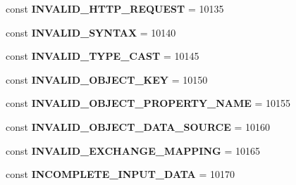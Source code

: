 \begin{DoxyCompactItemize}
\item 
\hypertarget{class_able_polecat___error_a11477fb5d1e040bd7d9d202cb12767a5}{}const {\bfseries I\+N\+V\+A\+L\+I\+D\+\_\+\+H\+T\+T\+P\+\_\+\+R\+E\+Q\+U\+E\+S\+T} = 10135\label{class_able_polecat___error_a11477fb5d1e040bd7d9d202cb12767a5}

\item 
\hypertarget{class_able_polecat___error_ab6687dae11b9c0fd3edf077baaa974c2}{}const {\bfseries I\+N\+V\+A\+L\+I\+D\+\_\+\+S\+Y\+N\+T\+A\+X} = 10140\label{class_able_polecat___error_ab6687dae11b9c0fd3edf077baaa974c2}

\item 
\hypertarget{class_able_polecat___error_a1ea3de8b3a498c613b19031b8d4fb269}{}const {\bfseries I\+N\+V\+A\+L\+I\+D\+\_\+\+T\+Y\+P\+E\+\_\+\+C\+A\+S\+T} = 10145\label{class_able_polecat___error_a1ea3de8b3a498c613b19031b8d4fb269}

\item 
\hypertarget{class_able_polecat___error_a07efb40c792f5e76e0ec15cc6a3130fb}{}const {\bfseries I\+N\+V\+A\+L\+I\+D\+\_\+\+O\+B\+J\+E\+C\+T\+\_\+\+K\+E\+Y} = 10150\label{class_able_polecat___error_a07efb40c792f5e76e0ec15cc6a3130fb}

\item 
\hypertarget{class_able_polecat___error_a1035e273960b2a05d32e5d0107839141}{}const {\bfseries I\+N\+V\+A\+L\+I\+D\+\_\+\+O\+B\+J\+E\+C\+T\+\_\+\+P\+R\+O\+P\+E\+R\+T\+Y\+\_\+\+N\+A\+M\+E} = 10155\label{class_able_polecat___error_a1035e273960b2a05d32e5d0107839141}

\item 
\hypertarget{class_able_polecat___error_ae4bd48c108737b98c981b8ce25c05ff5}{}const {\bfseries I\+N\+V\+A\+L\+I\+D\+\_\+\+O\+B\+J\+E\+C\+T\+\_\+\+D\+A\+T\+A\+\_\+\+S\+O\+U\+R\+C\+E} = 10160\label{class_able_polecat___error_ae4bd48c108737b98c981b8ce25c05ff5}

\item 
\hypertarget{class_able_polecat___error_a87591955776e0c871726f8e31d926c5b}{}const {\bfseries I\+N\+V\+A\+L\+I\+D\+\_\+\+E\+X\+C\+H\+A\+N\+G\+E\+\_\+\+M\+A\+P\+P\+I\+N\+G} = 10165\label{class_able_polecat___error_a87591955776e0c871726f8e31d926c5b}

\item 
\hypertarget{class_able_polecat___error_ad290dac0dc2d8a19ff6c405f702b7c9c}{}const {\bfseries I\+N\+C\+O\+M\+P\+L\+E\+T\+E\+\_\+\+I\+N\+P\+U\+T\+\_\+\+D\+A\+T\+A} = 10170\label{class_able_polecat___error_ad290dac0dc2d8a19ff6c405f702b7c9c}


\end{DoxyCompactItemize}
